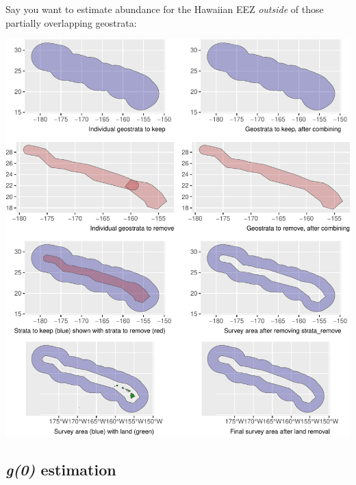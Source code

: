 \documentclass[
]{book}
\newenvironment{Shaded}{\begin{snugshade}}{\end{snugshade}}
\newcommand{\AttributeTok}[1]{\textcolor[rgb]{0.77,0.63,0.00}{#1}}
\newcommand{\ConstantTok}[1]{\textcolor[rgb]{0.00,0.00,0.00}{#1}}
\newcommand{\FunctionTok}[1]{\textcolor[rgb]{0.00,0.00,0.00}{#1}}
\newcommand{\NormalTok}[1]{#1}
\newcommand{\OtherTok}[1]{\textcolor[rgb]{0.56,0.35,0.01}{#1}}
\newcommand{\SpecialCharTok}[1]{\textcolor[rgb]{0.00,0.00,0.00}{#1}}
\newcommand{\StringTok}[1]{\textcolor[rgb]{0.31,0.60,0.02}{#1}}
\begin{document}
Say you want to estimate abundance for the Hawaiian EEZ \emph{outside} of those partially overlapping geostrata:

\begin{Shaded}
\end{Shaded}

\includegraphics{figures/unnamed-chunk-255-1.pdf}

\hypertarget{g0-estimation}{%
\subsection*{\texorpdfstring{\emph{g(0)} estimation}{g(0) estimation}}\label{g0-estimation}}
\end{document}
